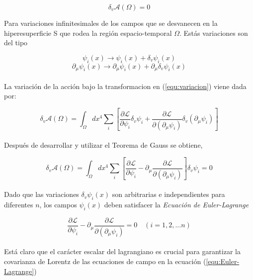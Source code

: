 \documentclass[12pt]{article}
\begin{document}
\begin{equation}
  \delta_v \mathcal{A}(\Omega)=0  
\end{equation}

Para variaciones infinitesimales de los campos que se desvanecen en la hiperesuperficie S que rodea la región espacio-temporal $\Omega$. Estás variaciones son del tipo

\[ \psi_i(x) \rightarrow \psi_i(x) + \delta_v  \psi_i(x) \]
\begin{equation}
\partial_\mu\psi_i(x) \rightarrow \partial_\mu\psi_i(x) + \partial_\mu \delta_v  \psi_i(x)
\label{equ:variacion}
\end{equation} \\

La variación de la acción bajo la transformacion en (\ref{equ:variacion}) viene dada por: 

%
\begin{equation}
  \delta_v \mathcal{A}(\Omega)=  \int_\Omega dx^4  \sum_{i}[\frac{\partial\mathcal{L}}{\partial\psi_i}\delta_v\psi_i + \frac{\partial\mathcal{L}}{\partial(\partial_\mu\psi_i)}\delta_v(\partial_\mu\psi_i)] 
\end{equation} \\

Después de desarrollar y utilizar el Teorema de Gauss se obtiene,

\begin{equation}
    \delta_v \mathcal{A}(\Omega)= \int_\Omega dx^4  \sum_{i}[\frac{\partial\mathcal{L}}{\partial\psi_i} - \partial_\mu  \frac{\partial\mathcal{L}}{\partial(\partial_\mu\psi_i)}]\delta_v\psi_i   =0
\end{equation} \\ 

Dado que las variaciones $\delta_v  \psi_i(x)$ son arbitrarias e independientes para diferentes $ n $, los campos $\psi_i(x)$ deben satisfacer la \textit{Ecuación de Euler-Lagrange } 
 
 \begin{equation}
\frac{\partial\mathcal{L}}{\partial\psi_i} - \partial_\mu  \frac{\partial\mathcal{L}}{\partial(\partial_\mu\psi_i)}=0 \quad (i=1,2,...n)
\label{equ:Euler-Lagrange}
 \end{equation} \\


 Está claro que el carácter escalar del lagrangiano es crucial para garantizar la covarianza de Lorentz de las ecuaciones de campo en la ecuación (\ref{equ:Euler-Lagrange})
 
\end{document}
